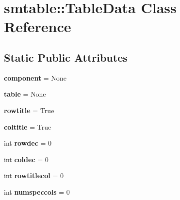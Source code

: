 \hypertarget{classsmtable_1_1TableData}{
\section{smtable::TableData Class Reference}
\label{classsmtable_1_1TableData}
}
\subsection*{Static Public Attributes}
\begin{DoxyCompactItemize}
\item 
\hypertarget{classsmtable_1_1TableData_a550004933e6f44dd9ce60c33f68ca5b1}{
{\bfseries component} = None}
\label{classsmtable_1_1TableData_a550004933e6f44dd9ce60c33f68ca5b1}

\item 
\hypertarget{classsmtable_1_1TableData_a6bd80c558fe9b603df313db7fcefee0a}{
{\bfseries table} = None}
\label{classsmtable_1_1TableData_a6bd80c558fe9b603df313db7fcefee0a}

\item 
\hypertarget{classsmtable_1_1TableData_ae82ea28f480847062c1e4ff0f9b9258d}{
{\bfseries rowtitle} = True}
\label{classsmtable_1_1TableData_ae82ea28f480847062c1e4ff0f9b9258d}

\item 
\hypertarget{classsmtable_1_1TableData_a1b4dacce4a52ebdca27eca1266071f0a}{
{\bfseries coltitle} = True}
\label{classsmtable_1_1TableData_a1b4dacce4a52ebdca27eca1266071f0a}

\item 
\hypertarget{classsmtable_1_1TableData_a3d9ea6e2b56d69757b06445ed2be3f83}{
int {\bfseries rowdec} = 0}
\label{classsmtable_1_1TableData_a3d9ea6e2b56d69757b06445ed2be3f83}

\item 
\hypertarget{classsmtable_1_1TableData_a2d2ecd9a46f5994c7f9d7f9c64ff5a76}{
int {\bfseries coldec} = 0}
\label{classsmtable_1_1TableData_a2d2ecd9a46f5994c7f9d7f9c64ff5a76}

\item 
\hypertarget{classsmtable_1_1TableData_a08d3b95c1e8e65b360a958fed1d2bf17}{
int {\bfseries rowtitlecol} = 0}
\label{classsmtable_1_1TableData_a08d3b95c1e8e65b360a958fed1d2bf17}

\item 
\hypertarget{classsmtable_1_1TableData_afcdfb877509d38c3c412d4ebd7b0329d}{
int {\bfseries numspeccols} = 0}
\label{classsmtable_1_1TableData_afcdfb877509d38c3c412d4ebd7b0329d}


\end{DoxyCompactItemize}

